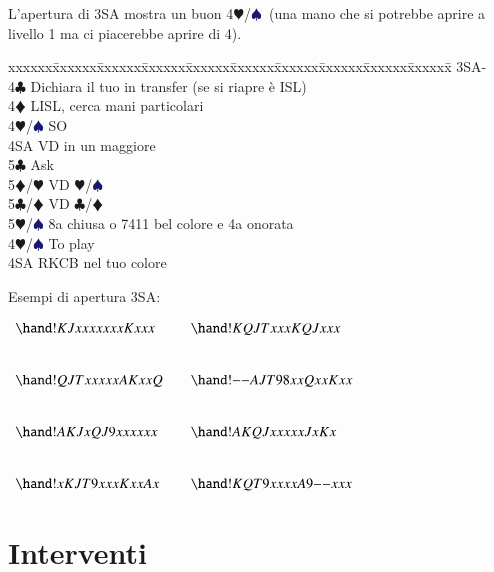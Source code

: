 \documentclass[a4paper,italian]{article}
\newcommand{\BC}{\textcolor{OliveGreen}{$\clubsuit$}}
\newcommand{\BD}{\textcolor{RedOrange}{$\vardiamondsuit$}}
\newcommand{\BH}{\textcolor{Red2}{$\varheartsuit${}}}
\newcommand{\BS}{\textcolor{MidnightBlue}{$\spadesuit${}}}
\newenvironment{bidtable}
{\begin{tabbing}

    xxxxxx\=xxxxxx\=xxxxxx\=xxxxxx\=xxxxxx\=xxxxxx\=xxxxxx\=xxxxxx\=xxxxxx\=xxxxxx\=\kill}
{\end{tabbing} }%
\newcommand{\void}{--}
\begin{document}
\begin{multicols}{2}
    L'apertura di 3SA mostra un buon 4\BH/\BS\ (una mano che si potrebbe aprire a livello 1 ma ci piacerebbe aprire di 4).


    \begin{bidtable}
        3SA-\+\\
        4\BC\> Dichiara il tuo in transfer (se si riapre è ISL)\\
        4\BD\> LISL, cerca mani particolari\+\\
        4\BH/\BS\> SO\\
        4SA\> VD in un maggiore\+\\
        5\BC\> Ask\+\\
        5\BD/\BH\> VD \BH/\BS\-\-\\
        5\BC/\BD\> VD \BC/\BD\\
        5\BH/\BS\> 8a chiusa o 7411 bel colore e 4a onorata\-\\
        4\BH/\BS\> To play\\
        4SA\> RKCB nel tuo colore
    \end{bidtable}
    \vfill\null
    \columnbreak

    Esempi di apertura 3SA:

    \gamefont{\rmfamily\normalsize}
    \otherfont{\rmfamily\normalsize}
    \bidderfont{\rmfamily\normalsize}
    \begin{center}

        $\begin{array}{lcl}
            \hand!{KJxxxxx}{x}{x}{Kxxx} & & \hand!{KQJTxxx}{KQJ}{xx}{x}\\[2.5em]
            \hand!{QJTxxxx}{x}{AKxx}{Q} & & \hand!{\void}{AJT98xx}{Qxx}{Kxx}\\[2.5em]
            \hand!{AKJx}{QJ9xxxx}{x}{x} & & \hand!{AKQJxxx}{xx}{Jx}{Kx}\\[2.5em]
            \hand!{x}{KJT9xxx}{Kxx}{Ax} & & \hand!{KQT9xxxx}{A9}{\void}{xxx}
        \end{array}$
    \end{center}
\end{multicols}

\section{Interventi}
\end{document}
